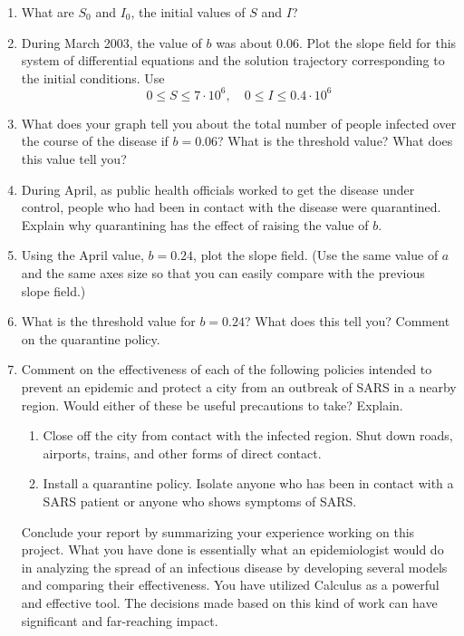 \documentclass
[justified,nohyper]
{tufte-handout}
\begin{document}
\begin{enumerate}
  \item What are $S_0$ and $I_0$, the initial values of $S$ and $I$?
  \item During March 2003, the value of $b$ was about 0.06. Plot the slope field for this system of differential equations and the solution trajectory corresponding to the initial conditions. Use \[0\leq S \leq 7\cdot 10^{6},\quad 0\leq I \leq 0.4\cdot 10^{6}\]
  \item What does your graph tell you about the total number of people infected over the course of the disease if $b=0.06$? What is the threshold value? What does this value tell you?
  \item During April, as public health officials worked to get the disease under control, people who had been in contact with the disease were quarantined. Explain why quarantining has the effect of raising the value of $b$.
  \item Using the April value, $b=0.24$, plot the slope field. (Use the same value of $a$ and the same axes size so that you can easily compare with the previous slope field.)
  \item What is the threshold value for $b=0.24$? What does this tell you? Comment on the quarantine policy.
  \item Comment on the effectiveness of each of the following policies intended to prevent an epidemic and protect a city from an outbreak of SARS in a nearby region. Would either of these be useful precautions to take? Explain.
  \begin{enumerate}
  \item Close off the city from contact with the infected region. Shut down roads, airports, trains, and other forms of direct contact.
  \item Install a quarantine policy. Isolate anyone who has been in contact with a SARS patient or anyone who shows symptoms of SARS.
\end{enumerate}

Conclude your report by summarizing your experience working on this project. What you have done is essentially what an epidemiologist would do in analyzing the spread of an infectious disease by developing several models and comparing their effectiveness. You have utilized Calculus as a powerful and effective tool. The decisions made based on this kind of work can have significant and far-reaching impact.

\end{enumerate}
\end{document}
